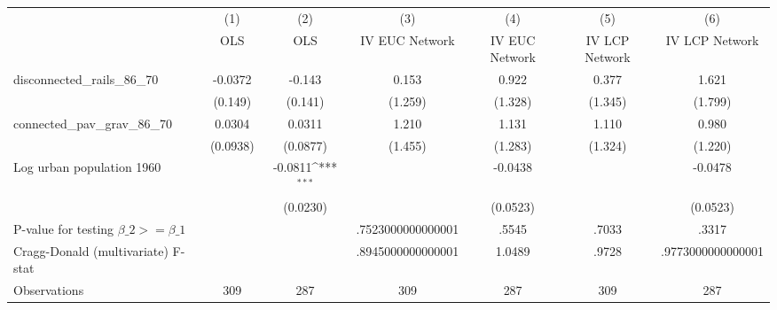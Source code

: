 {
\def\sym#1{\ifmmode^{#1}\else\(^{#1}\)\fi}
\begin{tabular}{l*{6}{c}}
\hline\hline
                &\multicolumn{1}{c}{(1)}&\multicolumn{1}{c}{(2)}&\multicolumn{1}{c}{(3)}&\multicolumn{1}{c}{(4)}&\multicolumn{1}{c}{(5)}&\multicolumn{1}{c}{(6)}\\
                &\multicolumn{1}{c}{OLS}&\multicolumn{1}{c}{OLS}&\multicolumn{1}{c}{IV EUC Network}&\multicolumn{1}{c}{IV EUC Network}&\multicolumn{1}{c}{IV LCP Network}&\multicolumn{1}{c}{IV LCP Network}\\
\hline
disconnected\_rails\_86\_70&  -0.0372         &   -0.143         &    0.153         &    0.922         &    0.377         &    1.621         \\
                &  (0.149)         &  (0.141)         &  (1.259)         &  (1.328)         &  (1.345)         &  (1.799)         \\
[1em]
connected\_pav\_grav\_86\_70&   0.0304         &   0.0311         &    1.210         &    1.131         &    1.110         &    0.980         \\
                & (0.0938)         & (0.0877)         &  (1.455)         &  (1.283)         &  (1.324)         &  (1.220)         \\
[1em]
Log urban population 1960&                  &  -0.0811\sym{***}&                  &  -0.0438         &                  &  -0.0478         \\
                &                  & (0.0230)         &                  & (0.0523)         &                  & (0.0523)         \\
\hline
P-value for testing $\beta\_{2} >= \beta\_{1}$&                  &                  &.7523000000000001         &    .5545         &    .7033         &    .3317         \\
Cragg-Donald (multivariate) F-stat&                  &                  &.8945000000000001         &   1.0489         &    .9728         &.9773000000000001         \\
Observations    &      309         &      287         &      309         &      287         &      309         &      287         \\
\hline\hline
\end{tabular}
}
